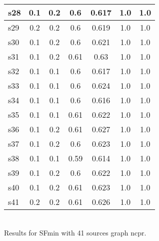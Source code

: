 \documentclass{article}
\begin{document}
\begin{tabular}{|l|c|c|c|c|c|c|}
\hline
s28 &0.1 & 0.2 & 0.6 & 0.617 & 1.0 & 1.0\\
\hline
s29 &0.2 & 0.2 & 0.6 & 0.619 & 1.0 & 1.0\\
\hline
s30 &0.1 & 0.2 & 0.6 & 0.621 & 1.0 & 1.0\\
\hline
s31 &0.1 & 0.2 & 0.61 & 0.63 & 1.0 & 1.0\\
\hline
s32 &0.1 & 0.1 & 0.6 & 0.617 & 1.0 & 1.0\\
\hline
s33 &0.1 & 0.1 & 0.6 & 0.624 & 1.0 & 1.0\\
\hline
s34 &0.1 & 0.1 & 0.6 & 0.616 & 1.0 & 1.0\\
\hline
s35 &0.1 & 0.1 & 0.61 & 0.622 & 1.0 & 1.0\\
\hline
s36 &0.1 & 0.2 & 0.61 & 0.627 & 1.0 & 1.0\\
\hline
s37 &0.1 & 0.2 & 0.6 & 0.623 & 1.0 & 1.0\\
\hline
s38 &0.1 & 0.1 & 0.59 & 0.614 & 1.0 & 1.0\\
\hline
s39 &0.1 & 0.2 & 0.6 & 0.622 & 1.0 & 1.0\\
\hline
s40 &0.1 & 0.2 & 0.61 & 0.623 & 1.0 & 1.0\\
\hline
s41 &0.2 & 0.2 & 0.61 & 0.626 & 1.0 & 1.0\\
\hline
\end{tabular}\\

\noindent Results for SFmin with 41 sources graph ncpr.
\end{document}

